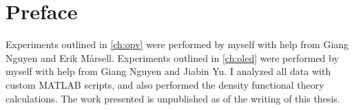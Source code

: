 
\chapter{Preface}

Experiments outlined in \autoref{ch:opv} were performed by myself with help from Giang Nguyen and Erik M\aa rsell. Experiments outlined in \autoref{ch:oled} were performed by myself with help from Giang Nguyen and Jiabin Yu. I analyzed all data with custom MATLAB scripts, and also performed the density functional theory calculations. The work presented is unpublished as of the writing of this thesis.